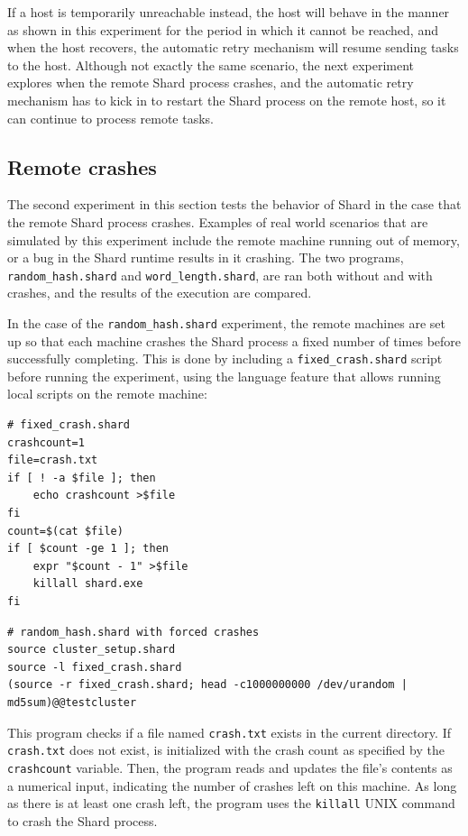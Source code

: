 \documentclass[twoside]{report}
\newcommand{\todoi}[1]{\todo[inline, color=blue!20]{TODO: {#1}}}
\begin{document}
\todoi{Conclude unreachable with all graphs}

If a host is temporarily unreachable instead, the host will behave in the manner as shown in this experiment for the period in which it cannot be reached, and when the host recovers, the automatic retry mechanism will resume sending tasks to the host.
Although not exactly the same scenario, the next experiment explores when the remote Shard process crashes, and the automatic retry mechanism has to kick in to restart the Shard process on the remote host, so it can continue to process remote tasks.

\subsection{Remote crashes}
The second experiment in this section tests the behavior of Shard in the case that the remote Shard process crashes.
Examples of real world scenarios that are simulated by this experiment include the remote machine running out of memory, or a bug in the Shard runtime results in it crashing.
The two programs, \texttt{random\_hash.shard} and \texttt{word\_length.shard}, are ran both without and with crashes, and the results of the execution are compared.

In the case of the \texttt{random\_hash.shard} experiment, the remote machines are set up so that each machine crashes the Shard process a fixed number of times before successfully completing.
This is done by including a \texttt{fixed\_crash.shard} script before running the experiment, using the language feature that allows running local scripts on the remote machine:
\begin{lstlisting}[language=Shard]
# fixed_crash.shard
crashcount=1
file=crash.txt
if [ ! -a $file ]; then
    echo crashcount >$file
fi
count=$(cat $file)
if [ $count -ge 1 ]; then
    expr "$count - 1" >$file
    killall shard.exe
fi
\end{lstlisting}
\begin{lstlisting}[language=Shard]
# random_hash.shard with forced crashes
source cluster_setup.shard
source -l fixed_crash.shard
(source -r fixed_crash.shard; head -c1000000000 /dev/urandom | md5sum)@@testcluster
\end{lstlisting}
This program checks if a file named \texttt{crash.txt} exists in the current directory.
If \texttt{crash.txt} does not exist, is initialized with the crash count as specified by the \texttt{crashcount} variable.
Then, the program reads and updates the file's contents as a numerical input, indicating the number of crashes left on this machine.
As long as there is at least one crash left, the program uses the \texttt{killall} UNIX command to crash the Shard process.
\end{document}

